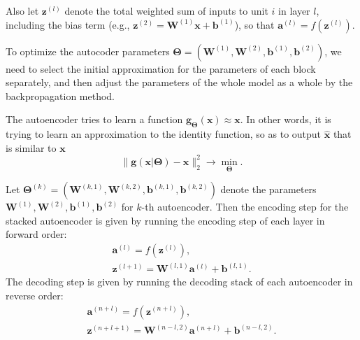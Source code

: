 \documentclass[12pt,twoside]{article}
\newcommand{\bz}{\mathbf{z}}
\newcommand{\bx}{\mathbf{x}}
\newcommand{\ba}{\mathbf{a}}
\newcommand{\bg}{\mathbf{g}}
\newcommand{\bb}{\mathbf{b}}
\newcommand{\bW}{\mathbf{W}}
\newcommand{\bmu}{\boldsymbol{\mu}}
\newcommand{\bphi}{\boldsymbol{\phi}}
\begin{document}
	Also let $\bz^{(l)}$ denote the total weighted sum of inputs to unit $i$ in layer $l$, including the bias term (e.g., $\bz^{(2)} =  \bW^{(1)} \bx + \bb^{(1)}$), so that $\ba^{(l)} = f(\bz^{(l)})$.



	To optimize the autocoder parameters $\mathbf{\Theta} = (\mathbf{W}^{(1)}, \mathbf{W}^{(2)}, \mathbf{b}^{(1)}, \mathbf{b}^{(2)})$, we need to select the initial approximation for the parameters of each block separately, and then adjust the parameters of the whole model as a whole by the backpropagation method.

	The autoencoder tries to learn a function $\bg_{\mathbf{\Theta}}(\bx) \approx \bx$. In other words, it is trying to learn an approximation to the identity function, so as to output $\hat{\bx}$ that is similar to $\bx$ 
	\begin{equation*}
		\|\mathbf{g}(\bx |\mathbf{\Theta}) - \mathbf{x}\|^2_2 \to \min\limits_{\mathbf{\Theta}}.
	\end{equation*}
	
	Let $\mathbf{\Theta}^{(k)} = (\mathbf{W}^{(k,1)}, \mathbf{W}^{(k,2)}, \mathbf{b}^{(k,1)}, \mathbf{b}^{(k,2)})$ denote the parameters $\mathbf{W}^{(1)}, \mathbf{W}^{(2)}, \mathbf{b}^{(1)}, \mathbf{b}^{(2)}$ for $k$-th autoencoder.  Then the encoding step for the stacked autoencoder is given by running the encoding step of each layer in forward order:
	\begin{align*}
	\mathbf{a}^{(l)} = f(\bz^{(l)}), \\
	\bz^{(l + 1)} = \mathbf{W}^{(l, 1)}\mathbf{a}^{(l)} + \mathbf{b}^{(l, 1)}.
	\end{align*}
	The decoding step is given by running the decoding stack of each autoencoder in reverse order:
	\begin{align*}
	\mathbf{a}^{(n + l)} = f(\bz^{(n + l)}), \\
	\bz^{(n + l + 1)} = \mathbf{W}^{(n - l, 2)}\mathbf{a}^{(n + l)} + \mathbf{b}^{(n - l, 2)}.
	\end{align*}
\end{document}
